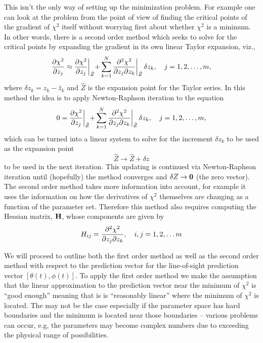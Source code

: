 This isn't the only way of setting up the minimization problem. For example one can look at the problem from the point of view of finding the critical points of the gradient of $\chi^2$ itself without worrying first about whether $\chi^2$ is a minimum. In other words, there is a second order method which seeks to solve for the critical points by expanding the gradient in its own linear Taylor expansion, viz., 
$${\partial \chi^2\over \partial z_j} \approx {\partial \chi^2\over \partial z_j} \biggl|_{\hat{Z}} + \sum_{k=1}^N  {\partial^2 \chi^2\over \partial z_j \partial z_k} \biggl|_{\hat{Z}}\,\delta z_k,\quad j =1,2,\hdots, m,$$
where $\delta z_k = z_k - \hat{z}_k$ and $\hat{Z}$ is the expansion point for the Taylor series.  In this method the idea is to apply Newton-Raphson iteration to the equation 
$$0 = {\partial \chi^2\over \partial z_j} \biggl|_{\hat{Z}} + \sum_{k=1}^N  {\partial^2 \chi^2\over \partial z_j \partial z_k} \biggl|_{\hat{Z}}\,\delta z_k,\quad j =1,2,\hdots, m,$$which can be turned into a linear system to solve for the increment $\delta z_k$ to be used as the expansion point $$\hat{Z} \rightarrow \hat{Z} + \delta z$$to be used in the next iteration. This updating is continued via Newton-Raphson iteration until (hopefully) the method converges and $\delta Z \rightarrow \bf{0}$ (the zero vector). The second order method takes more information into account, for example it uses the information on how the derivatives of $\chi^2$ themselves are changing as a function of the parameter set. Therefore this method also requires computing the Hessian matrix, $\bf H$, whose components are given by
$$H_{ij} = {\partial^2 \chi^2\over \partial z_j \partial z_k}, \quad i,j = 1,2,\hdots m$$

We will proceed to outline both the first order method as well as the second order method with respect to the prediction vector for the line-of-sight prediction vector $[\theta(t), \phi(t)]$. To apply the first order method we make the assumption that the linear approximation to the prediction vector near the minimum of $\chi^2$ is ``good enough'' meaning that is is ``reasonably linear'' where the minimum of $\chi^2$ is located. The may not be the case especially if the parameter space has hard boundaries and the minimum is located near those boundaries -- various problems can occur, e.g, the parameters may become complex numbers due to exceeding the physical range of possibilities.\\

